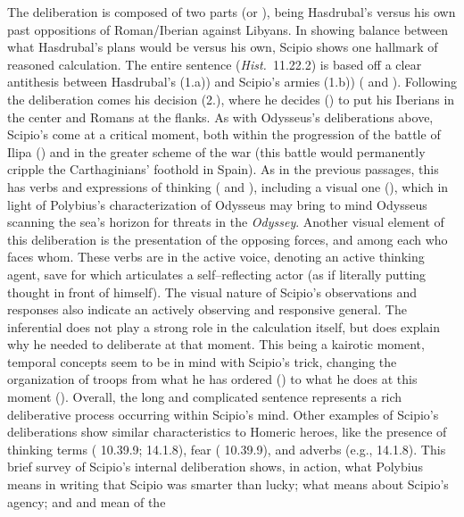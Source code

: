 \documentclass[12pt,letterpaper,oneside,final]{memoir}
\begin{document}
 The deliberation is composed of two parts (or  ), being Hasdrubal's versus his own past oppositions of Roman/Iberian against Libyans. In showing balance between what Hasdrubal's plans would be versus his own, Scipio shows one hallmark of reasoned calculation. The entire sentence (\emph{Hist.}~11.22.2) is based off a clear antithesis between Hasdrubal's (1.a)) and Scipio's armies (1.b)) ( and ). Following the deliberation comes his decision (2.), where he decides () to put his Iberians in the center and Romans at the flanks. As with Odysseus's deliberations above, Scipio's come at a critical moment, both within the progression of the battle of Ilipa () and  in the greater scheme of the war (this battle would permanently cripple the Carthaginians' foothold in Spain). As in the previous passages, this has verbs and expressions of thinking ( and ), including a visual one (), which in light of Polybius's characterization of Odysseus may bring to mind Odysseus scanning the sea's horizon for threats in the \emph{Odyssey}. Another visual element of this deliberation is the presentation of the opposing forces, and among each who faces whom. These verbs are in the active voice, denoting an active thinking agent, save for  which articulates a self--reflecting actor (as if literally putting thought in front of himself). The visual nature of Scipio's observations and responses also indicate an actively observing and responsive general. The inferential  does not play a strong role in the calculation itself, but does explain why he needed to deliberate at that moment. This being a kairotic moment, temporal concepts seem to be in mind with Scipio's trick, changing the organization of troops from what he has ordered () to what he does at this moment (). Overall, the long and complicated sentence represents a rich deliberative process occurring within Scipio's mind. Other examples of Scipio's deliberations show similar characteristics to Homeric heroes, like the presence of thinking terms ( 10.39.9;  14.1.8), fear ( 10.39.9), and adverbs (e.g.,  14.1.8). This brief survey of Scipio's internal deliberation shows, in action, what Polybius means in writing that Scipio was smarter than lucky; what \textcite{poznanski1994} means about Scipio's agency; and \textcite{pedech1964} and \textcite{podes1990} mean of the 
\end{document}
